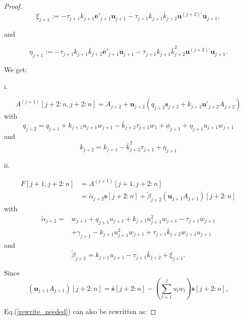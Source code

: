 \documentclass{article}
\begin{document}
\begin{proof}
$$\xi_{j+1}:=-\tau_{j+1} k_{j+1}\mathbf{e'}_{j+1}\mathbf{u}_{j+1}-\tau_{j+1} k_{j+1}\bar{k}_{j+2}\mathbf{u}^{(j+2)'}\mathbf{u}_{j+1},$$

and 

$$\eta_{j+1}:=-\tau_{j+1} k_{j+1}\bar{k}_{j+2}\mathbf{e'}_{j+1}\mathbf{u}_{j+1}-\tau_{j+1} k_{j+1} \bar{k}_{j+2}^2\mathbf{u}^{(j+2)'}\mathbf{u}_{j+1}.$$

We get:

i.

\begin{equation}
    A^{(j+1)}[j+2:n,j+2:n]=A_{j+2}+\mathbf{u}_{j+2}(q_{j+2}\mathbf{s}_{j+2}+k_{j+2}\mathbf{u'}_{j+2}A_{j+2})\label{After_HT_2}
\end{equation}
with
\begin{equation}
    q_{j+2}=q_{j+1}+k_{j+1}u_{j+1}w_{j+1}-\bar{k}_{j+2}\tau_{j+1} w_1+\phi_{j+1}+\eta_{j+1}u_{j+1}w_{j+1}
\end{equation}
and
\begin{equation}
    k_{j+2}=k_{j+1}-\bar{k}_{j+2}^2\tau_{j+1}+\eta_{j+1}
\end{equation}

ii.

\begin{equation}
\begin{aligned}
    F[j+1,j+2:n]&=A^{(j+1)}[j+1,j+2:n]\\&=\tilde{\alpha}_{j+2} \mathbf{s}[j+2:n]+\tilde{\beta}_{j+2}(\mathbf{u}_{j+1}A_{j+1})[j+2:n] \label{rewrite_needed}
\end{aligned}
\end{equation}
with
\begin{equation}
\begin{aligned}
    \tilde{\alpha}_{j+2}=&w_{j+1}+q_{j+1}u_{j+1}+k_{j+1}u_{j+1}^2w_{j+1}-\tau_{j+1} w_{j+1}\\
    &+\gamma_{j+1} - k_{j+1}u_{j+1}^2w_{j+1}+\tau_{j+1} \bar{k}_{j+2}w_{j+1}u_{j+1}
\end{aligned}
\end{equation}
and
\begin{equation}
    \tilde{\beta}_{j+2}=k_{j+1}u_{j+1}-\tau_{j+1} \bar{k}_{j+2}+\xi_{j+1}.
\end{equation}

Since 
\begin{equation}
    (\mathbf{u}_{j+1}A_{j+1})[j+2:n]=\bar{\mathbf{s}}[j+2:n]-(\sum_{l=1}^ju_lw_l)\mathbf{s}[j+2:n],
\end{equation}

Eq.(\ref{rewrite_needed}) can also be rewritten as:


\end{proof}
\end{document}
